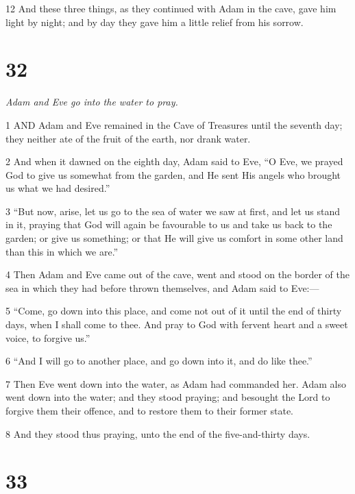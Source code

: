 \par 12 And these three things, as they continued with Adam in the cave, gave him light by night; and by day they gave him a little relief from his sorrow.

\chapter{32}

\par \textit{Adam and Eve go into the water to pray.}

\par 1 AND Adam and Eve remained in the Cave of Treasures until the seventh day; they neither ate of the fruit of the earth, nor drank water.

\par 2 And when it dawned on the eighth day, Adam said to Eve, “O Eve, we prayed God to give us somewhat from the garden, and He sent His angels who brought us what we had desired.”

\par 3 “But now, arise, let us go to the sea of water we saw at first, and let us stand in it, praying that God will again be favourable to us and take us back to the garden; or give us something; or that He will give us comfort in some other land than this in which we are.”

\par 4 Then Adam and Eve came out of the cave, went and stood on the border of the sea in which they had before thrown themselves, and Adam said to Eve:—

\par 5 “Come, go down into this place, and come not out of it until the end of thirty days, when I shall come to thee. And pray to God with fervent heart and a sweet voice, to forgive us.”

\par 6 “And I will go to another place, and go down into it, and do like thee.”

\par 7 Then Eve went down into the water, as Adam had commanded her. Adam also went down into the water; and they stood praying; and besought the Lord to forgive them their offence, and to restore them to their former state.

\par 8 And they stood thus praying, unto the end of the five-and-thirty days.

\chapter{33}

